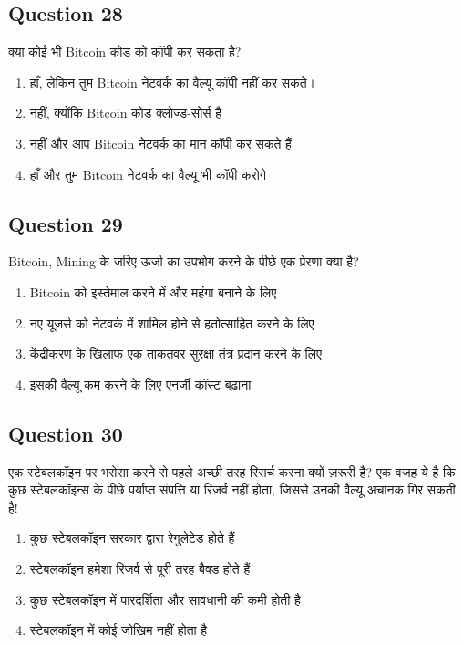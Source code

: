 \documentclass[12pt,a4paper]{article}
\begin{document}
\bigskip


\subsection*{Question 28}
क्या कोई भी Bitcoin कोड को कॉपी कर सकता है?

\begin{enumerate}[label=\Alph*., leftmargin=*]
\item हाँ, लेकिन तुम Bitcoin नेटवर्क का वैल्यू कॉपी नहीं कर सकते।
\item नहीं, क्योंकि Bitcoin कोड क्लोज्ड-सोर्स है
\item नहीं और आप Bitcoin नेटवर्क का मान कॉपी कर सकते हैं
\item हाँ और तुम Bitcoin नेटवर्क का वैल्यू भी कॉपी करोगे
\end{enumerate}

\bigskip


\subsection*{Question 29}
Bitcoin, Mining के जरिए ऊर्जा का उपभोग करने के पीछे एक प्रेरणा क्या है?

\begin{enumerate}[label=\Alph*., leftmargin=*]
\item Bitcoin को इस्तेमाल करने में और महंगा बनाने के लिए
\item नए यूज़र्स को नेटवर्क में शामिल होने से हतोत्साहित करने के लिए
\item केंद्रीकरण के खिलाफ एक ताकतवर सुरक्षा तंत्र प्रदान करने के लिए
\item इसकी वैल्यू कम करने के लिए एनर्जी कॉस्ट बढ़ाना
\end{enumerate}

\bigskip


\subsection*{Question 30}
एक स्टेबलकॉइन पर भरोसा करने से पहले अच्छी तरह रिसर्च करना क्यों ज़रूरी है? एक वजह ये है कि कुछ स्टेबलकॉइन्स के पीछे पर्याप्त संपत्ति या रिज़र्व नहीं होता, जिससे उनकी वैल्यू अचानक गिर सकती है!

\begin{enumerate}[label=\Alph*., leftmargin=*]
\item कुछ स्टेबलकॉइन सरकार द्वारा रेगुलेटेड होते हैं
\item स्टेबलकॉइन हमेशा रिजर्व से पूरी तरह बैक्ड होते हैं
\item कुछ स्टेबलकॉइन में पारदर्शिता और सावधानी की कमी होती है
\item स्टेबलकॉइन में कोई जोखिम नहीं होता है
\end{enumerate}
\end{document}
